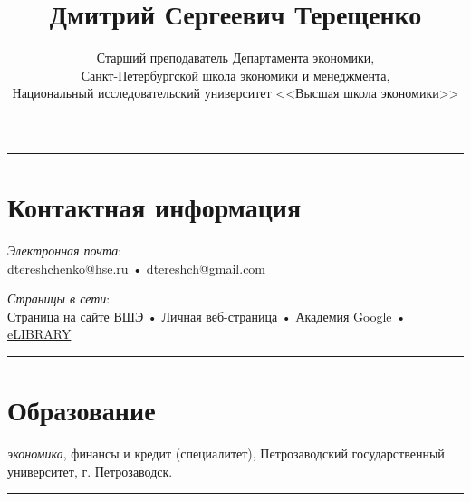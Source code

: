 \documentclass[10pt]{article}
\title{\bfseries\Huge Дмитрий Сергеевич Терещенко}
\author{Старший преподаватель Департамента экономики,\\Санкт-Петербургской школа экономики и менеджмента,\\Национальный исследовательский университет <<Высшая школа экономики>>}
\date{}
\newcommand{\years}[1]{\marginnote{\scriptsize #1}}
\begin{document}
\maketitle

\hrule
\section*{Контактная информация}
\noindent

	\textit{Электронная почта}: \\
	\href{mailto:dtereshchenko@hse.ru}{dtereshchenko@hse.ru}  • 
	\href{mailto:dtereshch@gmail.com}{dtereshch@gmail.com}\\
	
	\vspace{0.5em}

	\textit{Страницы в сети}: \\
	\href{https://www.hse.ru/staff/dtereshch}{Страница на сайте ВШЭ}  •
	\href{https://dtereshch.github.io/homepage/}{Личная веб-страница}  •
	\href{https://petrsu.ru/persons/2529/teretshenko}{Академия Google} •
	\href{https://elibrary.ru/author_items.asp?authorid=640419&pubrole=100&show_refs=1&show_option=0}{eLIBRARY}


\vspace{2em}
\hrule




\section*{Образование}
\noindent
\years{2005-2010}\textit{экономика}, финансы и кредит (специалитет), Петрозаводский государственный университет, г. Петрозаводск. \\

\vspace{2em}
\hrule
\end{document}
